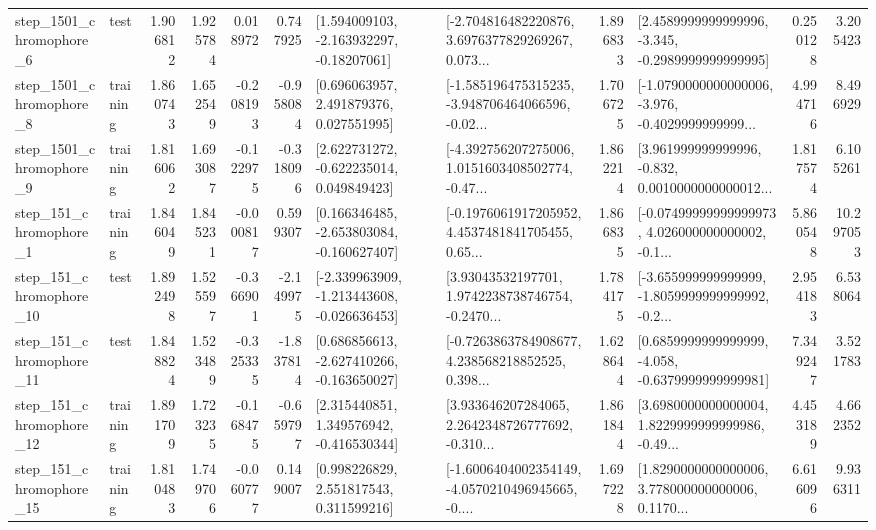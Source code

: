 \begin{tabular}{llrrrrllrlrr}
  step\_1501\_chromophore\_6 &      test &      1.906812 &    1.925784 &      0.018972 &  0.747925 &    [1.594009103, -2.163932297, -0.18207061] &  [-2.704816482220876, 3.6976377829269267, 0.073... &       1.896833 &  [2.4589999999999996, -3.345, -0.2989999999999995] &            0.250128 &          3.205423 \\
  step\_1501\_chromophore\_8 &  training &      1.860743 &    1.652549 &     -0.208193 & -0.958084 &     [0.696063957, 2.491879376, 0.027551995] &  [-1.585196475315235, -3.948706464066596, -0.02... &       1.706725 &  [-1.0790000000000006, -3.976, -0.4029999999999... &            4.994716 &          8.496929 \\
  step\_1501\_chromophore\_9 &  training &      1.816062 &    1.693087 &     -0.122975 & -0.318096 &    [2.622731272, -0.622235014, 0.049849423] &  [-4.392756207275006, 1.0151603408502774, -0.47... &       1.862214 &  [3.961999999999996, -0.832, 0.0010000000000012... &            1.817574 &          6.105261 \\
   step\_151\_chromophore\_1 &  training &      1.846049 &    1.845231 &     -0.000817 &  0.599307 &   [0.166346485, -2.653803084, -0.160627407] &  [-0.1976061917205952, 4.4537481841705455, 0.65... &       1.866835 &  [-0.07499999999999973, 4.026000000000002, -0.1... &            5.860548 &         10.297053 \\
  step\_151\_chromophore\_10 &      test &      1.892498 &    1.525597 &     -0.366901 & -2.149975 &  [-2.339963909, -1.213443608, -0.026636453] &  [3.93043532197701, 1.9742238738746754, -0.2470... &       1.784175 &  [-3.655999999999999, -1.8059999999999992, -0.2... &            2.954183 &          6.538064 \\
  step\_151\_chromophore\_11 &      test &      1.848824 &    1.523489 &     -0.325335 & -1.837814 &   [0.686856613, -2.627410266, -0.163650027] &  [-0.7263863784908677, 4.238568218852525, 0.398... &       1.628644 &  [0.6859999999999999, -4.058, -0.6379999999999981] &            7.349247 &          3.521783 \\
  step\_151\_chromophore\_12 &  training &      1.891709 &    1.723235 &     -0.168475 & -0.659797 &    [2.315440851, 1.349576942, -0.416530344] &  [3.933646207284065, 2.2642348726777692, -0.310... &       1.861844 &  [3.6980000000000004, 1.8229999999999986, -0.49... &            4.453189 &          4.662352 \\
  step\_151\_chromophore\_15 &  training &      1.810483 &    1.749706 &     -0.060777 &  0.149007 &     [0.998226829, 2.551817543, 0.311599216] &  [-1.6006404002354149, -4.0570210496945665, -0.... &       1.697228 &  [1.8290000000000006, 3.778000000000006, 0.1170... &            6.616096 &          9.936311 \\

\end{tabular}
